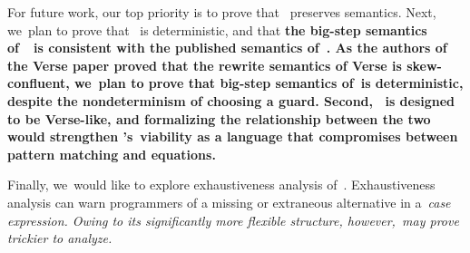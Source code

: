 \documentclass[article,screen,12pt, nonacm]{acmart}
\begin{document}
    For future work, our top priority is to prove that \DTran\ preserves
    semantics.
    Next, we~plan to prove that
    \VMinus~is deterministic, and that \bf{the big-step semantics of~\VMinus~is
    consistent with the published semantics of~\VC.} As the authors of the Verse
    paper proved that the rewrite semantics of Verse is skew-confluent, we~plan
    to prove that big-step semantics of~\VMinus is deterministic, despite the
    nondeterminism of choosing a guard. Second, \VMinus~is designed to be
    Verse-like, and formalizing the relationship between the two would
    strengthen \VMinus's~viability as a language that compromises between
    pattern matching and equations. 

    Finally, we~would like to explore
    exhaustiveness analysis of~\VMinus.
    Exhaustiveness analysis
    can warn programmers of a missing or extraneous alternative in a~\it{case} expression.
    Owing to its significantly more flexible structure,
    however,~\iffibf may prove trickier to analyze.
    
    
    
    
    
\end{document}
